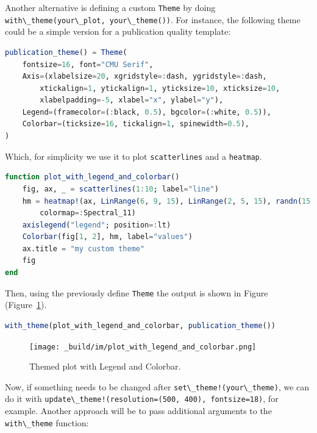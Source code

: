\documentclass[
  notoc %
]{tufte-book}
\newcommand{\passthrough}[1]{#1}
\begin{document}
Another alternative is defining a custom \passthrough{\lstinline!Theme!}
by doing
\passthrough{\lstinline!with\_theme(your\_plot, your\_theme())!}. For
instance, the following theme could be a simple version for a
publication quality template:

\begin{lstlisting}[language=Julia]
publication_theme() = Theme(
    fontsize=16, font="CMU Serif",
    Axis=(xlabelsize=20, xgridstyle=:dash, ygridstyle=:dash,
        xtickalign=1, ytickalign=1, yticksize=10, xticksize=10,
        xlabelpadding=-5, xlabel="x", ylabel="y"),
    Legend=(framecolor=(:black, 0.5), bgcolor=(:white, 0.5)),
    Colorbar=(ticksize=16, tickalign=1, spinewidth=0.5),
)
\end{lstlisting}

Which, for simplicity we use it to plot
\passthrough{\lstinline!scatterlines!} and a
\passthrough{\lstinline!heatmap!}.

\begin{lstlisting}[language=Julia]
function plot_with_legend_and_colorbar()
    fig, ax, _ = scatterlines(1:10; label="line")
    hm = heatmap!(ax, LinRange(6, 9, 15), LinRange(2, 5, 15), randn(15, 15);
        colormap=:Spectral_11)
    axislegend("legend"; position=:lt)
    Colorbar(fig[1, 2], hm, label="values")
    ax.title = "my custom theme"
    fig
end
\end{lstlisting}

Then, using the previously define \passthrough{\lstinline!Theme!} the
output is shown in Figure
(Figure~\ref{fig:plot_with_legend_and_colorbar}).

\begin{lstlisting}[language=Julia]
with_theme(plot_with_legend_and_colorbar, publication_theme())
\end{lstlisting}

\begin{figure}
\hypertarget{fig:plot_with_legend_and_colorbar}{%
\centering
\texttt{[image: \_build/im/plot\_with\_legend\_and\_colorbar.png]}
\caption{Themed plot with Legend and
Colorbar.}\label{fig:plot_with_legend_and_colorbar}
}
\end{figure}

Now, if something needs to be changed after
\passthrough{\lstinline"set\_theme!(your\_theme)"}, we can do it with
\passthrough{\lstinline"update\_theme!(resolution=(500, 400), fontsize=18)"},
for example. Another approach will be to pass additional arguments to
the \passthrough{\lstinline!with\_theme!} function:
\end{document}
